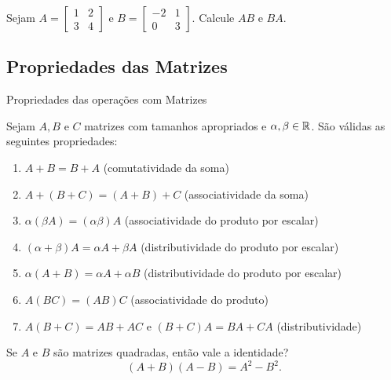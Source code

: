 \begin{frame}[label=matrizes]
\begin{casa}
Sejam 
$A=\begin{bmatrix}
1 & 2 \\
3 & 4
\end{bmatrix} $ e 
$B=\begin{bmatrix}
-2 & 1 \\
0 & 3
\end{bmatrix}$.
Calcule $AB$ e $BA$. 
\end{casa}
\end{frame}

\subsection*{Propriedades das Matrizes }

\begin{frame}[label=matrizes]{Propriedades das operações com Matrizes}

Sejam $A, B$ e $C$ matrizes com tamanhos apropriados e $\alpha,\beta\in \mathbb{R}$. São válidas as seguintes propriedades:

\begin{enumerate}
\item $A+B=B+A$ (comutatividade da soma)
\item $A+(B+C)=(A+B)+C$ (associatividade da soma)
\item $\alpha(\beta A)=(\alpha \beta)A$ (associatividade do produto por escalar)
\item $(\alpha+\beta)A=\alpha A+\beta A$ (distributividade do produto por escalar)
\item $\alpha(A+B)=\alpha A+\alpha B$ (distributividade do produto por escalar)
\item $A(BC)=(AB)C$ (associatividade do produto)
\item $A(B+C)=AB+AC$ e $(B+C)A=BA+CA$ (distributividade)
\end{enumerate}


\end{frame}


\begin{frame}
\begin{exe}
Se $A$ e $B$ são matrizes quadradas, então vale a identidade? \[(A+B)(A-B)=A^2-B^2.\]
\end{exe}
\end{frame}

